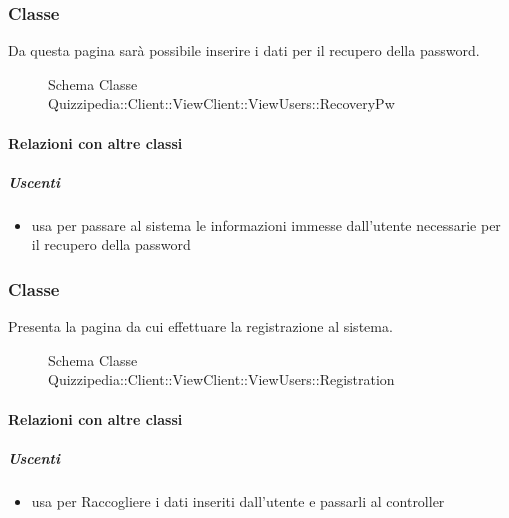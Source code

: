 \subsubsection{Classe }
Da questa pagina sarà possibile inserire i dati per il recupero della password.
\begin{figure}[H]
\centering
\noindent{}
\caption[Schema Classe RecoveryPw]{Schema Classe Quizzipedia::Client::ViewClient::ViewUsers::RecoveryPw}
\end{figure}
\paragraph{Relazioni con altre classi}
\subparagraph{Uscenti}
\begin{itemize}
\item usa  per passare al sistema le informazioni immesse dall'utente necessarie per il recupero della password
\end{itemize}
\subsubsection{Classe }
Presenta la pagina da cui effettuare la  registrazione al sistema.
\begin{figure}[H]
\centering
\noindent{}
\caption[Schema Classe Registration]{Schema Classe Quizzipedia::Client::ViewClient::ViewUsers::Registration}
\end{figure}
\paragraph{Relazioni con altre classi}
\subparagraph{Uscenti}
\begin{itemize}
\item usa  per Raccogliere i dati inseriti dall'utente e passarli al controller
\end{itemize}
